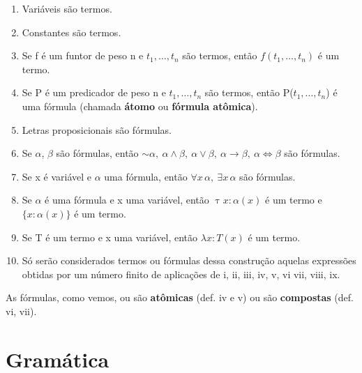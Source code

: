\begin{enumerate}[label=\roman*)]
    \item Variáveis são termos.
    \item Constantes são termos.
    \item Se f é um funtor de peso n e $t_1, \dots, t_n$ são termos, então $f(t_1, \dots, t_n)$ é um termo.
    \item Se P é um predicador de peso n e $t_1, \dots, t_n$ são termos, então P($t_1, \dots, t_n$) é uma fórmula (chamada \textbf{átomo} ou \textbf{fórmula atômica}).
    \item Letras proposicionais são fórmulas.
    \item Se $\alpha$, $\beta$ são fórmulas, então $\sim \alpha,\ \alpha \land \beta,\ \alpha \lor \beta,\ \alpha \to \beta,\ \alpha \iff \beta$ são fórmulas.
    \item Se x é variável e $\alpha$ uma fórmula, então $\forall x \, \alpha,\ \exists x \, \alpha$ são fórmulas.
    \item Se $\alpha$ é uma fórmula e x uma variável, então $\uptau x \colon \alpha(x)$ é um termo e $\{ x \colon \alpha(x)\}$ é um termo.
    \item Se T é um termo e x uma variável, então $\lambda x \colon T(x)$ é um termo.
    \item Só serão considerados termos ou fórmulas dessa construção aquelas expressões obtidas por um número finito de aplicações de i, ii, iii, iv, v, vi vii, viii, ix.
\end{enumerate}

As fórmulas, como vemos, ou são \textbf{atômicas} (def. iv e v) ou são \textbf{compostas} (def. vi, vii).

\section{Gramática}

